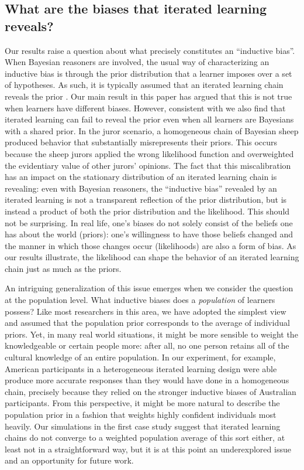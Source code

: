 \documentclass[doc]{apa6}
\begin{document}
\subsection{What are the biases that iterated learning reveals?}

Our results raise a question about what precisely constitutes an ``inductive bias''. When Bayesian reasoners are involved, the usual way of characterizing an inductive bias is through the prior distribution that a learner imposes over a set of hypotheses. As such, it is typically assumed that an iterated learning chain reveals the prior \parencite{griffiths_language_2007}. Our main result in this paper has argued that this is not true when learners have different biases. However, consistent with \textcite{smith2009iterated} we also find that iterated learning can fail to reveal the prior even when all learners are Bayesians with a shared prior. In the juror scenario, a homogeneous chain of Bayesian {\sc sheep} produced behavior that substantially misrepresents their priors. This occurs because the {\sc sheep} jurors applied the wrong likelihood function and overweighted the evidentiary value of other jurors' opinions. The fact that this miscalibration has an impact on the stationary distribution of an iterated learning chain is revealing: even with Bayesian reasoners, the ``inductive bias'' revealed by an iterated learning is not a transparent reflection of the prior distribution, but is instead a product of both the prior distribution and the likelihood. This should not be surprising. In real life, one's biases do not solely consist of the beliefs one has about the world (priors): one's willingness to have those beliefs changed and the manner in which those changes occur (likelihoods) are also a form of bias. As our results illustrate, the likelihood can shape the behavior of an iterated learning chain just as much as the priors. 

An intriguing generalization of this issue emerges when we consider the question at the population level. What inductive biases does a {\it population} of learners possess? Like most researchers in this area, we have adopted the simplest view and assumed that the population prior corresponds to the average of individual priors. Yet, in many real world situations, it might be more sensible to weight the knowledgeable or certain people more: after all, no one person retains all of the cultural knowledge of an entire population. In our experiment, for example, American participants in a heterogeneous iterated learning design were able produce more accurate responses than they would have done in a homogeneous chain, precisely because they relied on the stronger inductive biases of Australian participants. From this perspective, it might be more natural to describe the population prior in a fashion that weights highly confident individuals most heavily. Our simulations in the first case study suggest that iterated learning chains do not converge to a weighted population average of this sort either, at least not in a straightforward way, but it is at this point an underexplored issue and an opportunity for future work. 
\end{document}
